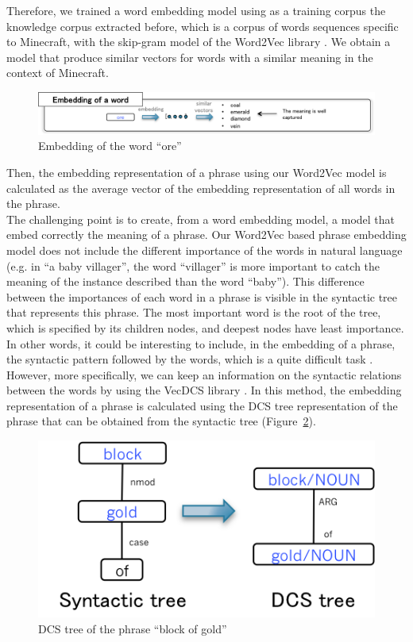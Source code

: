 \documentclass[twocolumn]{article}
\begin{document}
Therefore, we trained a word embedding model using as a training corpus the knowledge corpus extracted before, which is a corpus of words sequences specific to Minecraft, with the skip-gram model of the Word2Vec library \cite{mikolov2013distributed}. We obtain a model that produce similar vectors for words with a similar meaning in the context of Minecraft.

\begin{figure}[t]
   \centering \includegraphics[width=\linewidth]{Figures/Semantic_Parsing/wordEmbedding.png}
   \caption{\label{wordEmbedding} Embedding of the word ``ore''}
\end{figure}

Then, the embedding representation of a phrase using our Word2Vec model is calculated as the average vector of the embedding representation of all words in the phrase.\\
The challenging point is to create, from a word embedding model, a model that embed correctly the meaning of a phrase. Our Word2Vec based phrase embedding model does not include the different importance of the words in natural language (e.g. in ``a baby villager'', the word ``villager'' is more important to catch the meaning of the instance described than the word ``baby''). This difference between the importances of each word in a phrase is visible in the syntactic tree that represents this phrase. The most important word is the root of the tree, which is specified by its children nodes, and deepest nodes have least importance.\\
In other words, it could be interesting to include, in the embedding of a phrase, the syntactic pattern followed by the words, which is a quite difficult task \cite{takase2016modeling}.
However, more specifically, we can keep an information on the syntactic relations between the words by using the VecDCS library \cite{tian2016learning}. In this method, the embedding representation of a phrase is calculated using the DCS tree representation of the phrase that can be obtained from the syntactic tree (Figure~\ref{dcsTree}).

\begin{figure}[t]
   \centering \includegraphics[width=\linewidth]{Figures/Semantic_Parsing/dcsTree.png}
   \caption{\label{dcsTree} DCS tree of the phrase ``block of gold''}
\end{figure}
\end{document}
